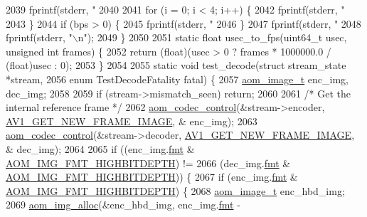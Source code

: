 \begin{DoxyCodeInclude}
{{{{{{{{{{{{{{{{{{{{{{{{{{{{{{{{{{{{{{{{{{{{{{{{{{{2039   fprintf(stderr, \textcolor{stringliteral}{" %
2040 
2041   \textcolor{keywordflow}{for} (i = 0; i < 4; i++) \{
2042     fprintf(stderr, \textcolor{stringliteral}{" %
2043   \}
2044   \textcolor{keywordflow}{if} (bps > 0) \{
2045     fprintf(stderr, \textcolor{stringliteral}{" %
2046   \}
2047   fprintf(stderr, \textcolor{stringliteral}{" %
2048   fprintf(stderr, \textcolor{stringliteral}{"\(\backslash\)n"});
2049 \}
2050 
2051 \textcolor{keyword}{static} \textcolor{keywordtype}{float} usec\_to\_fps(uint64\_t usec, \textcolor{keywordtype}{unsigned} \textcolor{keywordtype}{int} frames) \{
2052   \textcolor{keywordflow}{return} (\textcolor{keywordtype}{float})(usec > 0 ? frames * 1000000.0 / (float)usec : 0);
2053 \}
2054 
2055 \textcolor{keyword}{static} \textcolor{keywordtype}{void} test\_decode(\textcolor{keyword}{struct} stream\_state *stream,
2056     \textcolor{keyword}{enum} TestDecodeFatality fatal) \{
2057   \hyperlink{structaom__image}{aom\_image\_t} enc\_img, dec\_img;
2058 
2059   \textcolor{keywordflow}{if} (stream->mismatch\_seen) \textcolor{keywordflow}{return};
2060 
2061   \textcolor{comment}{/* Get the internal reference frame */}
2062   \hyperlink{group__codec_ga6da974f4eeaba1fa74106b28d0fe6ac5}{aom\_codec\_control}(&stream->encoder, \hyperlink{group__aom_gga9421a1fa78c0d9587ae5aa6c1cb3d659a410c706a34f5295996658cc5044a700f}{AV1\_GET\_NEW\_FRAME\_IMAGE}, &
      enc\_img);
2063   \hyperlink{group__codec_ga6da974f4eeaba1fa74106b28d0fe6ac5}{aom\_codec\_control}(&stream->decoder, \hyperlink{group__aom_gga9421a1fa78c0d9587ae5aa6c1cb3d659a410c706a34f5295996658cc5044a700f}{AV1\_GET\_NEW\_FRAME\_IMAGE}, &
      dec\_img);
2064 
2065   \textcolor{keywordflow}{if} ((enc\_img.\hyperlink{structaom__image_a6c64b1ab918d80d52eb8f5d6d957e825}{fmt} & \hyperlink{aom__image_8h_a607b37d91f75442f54223ecd85f1b6cb}{AOM\_IMG\_FMT\_HIGHBITDEPTH}) !=
2066       (dec\_img.\hyperlink{structaom__image_a6c64b1ab918d80d52eb8f5d6d957e825}{fmt} & \hyperlink{aom__image_8h_a607b37d91f75442f54223ecd85f1b6cb}{AOM\_IMG\_FMT\_HIGHBITDEPTH})) \{
2067     \textcolor{keywordflow}{if} (enc\_img.\hyperlink{structaom__image_a6c64b1ab918d80d52eb8f5d6d957e825}{fmt} & \hyperlink{aom__image_8h_a607b37d91f75442f54223ecd85f1b6cb}{AOM\_IMG\_FMT\_HIGHBITDEPTH}) \{
2068       \hyperlink{structaom__image}{aom\_image\_t} enc\_hbd\_img;
2069       \hyperlink{aom__image_8h_a570db29fbd122951235a08fe9375f6bb}{aom\_img\_alloc}(&enc\_hbd\_img, enc\_img.\hyperlink{structaom__image_a6c64b1ab918d80d52eb8f5d6d957e825}{fmt} - 
}}}}}}}}}}}}}}}}}}}}}}}}}}}}}}}}}}}}}}}}}}}}}}}}}}}}}}}
\end{DoxyCodeInclude}
